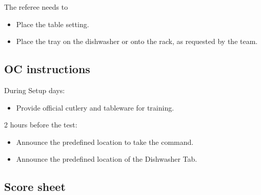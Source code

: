The referee needs to
\begin{itemize}
	\item Place the table setting.
	\item Place the tray on the dishwasher or onto the rack, as requested by the team.
\end{itemize}

\subsection*{OC instructions}
During Setup days:
\begin{itemize}
	\item Provide official cutlery and tableware for training.
\end{itemize}

2 hours before the test:
\begin{itemize}
	\item Announce the predefined location to take the command.
	\item Announce the predefined location of the Dishwasher Tab.
\end{itemize}

\subsection*{Score sheet}



